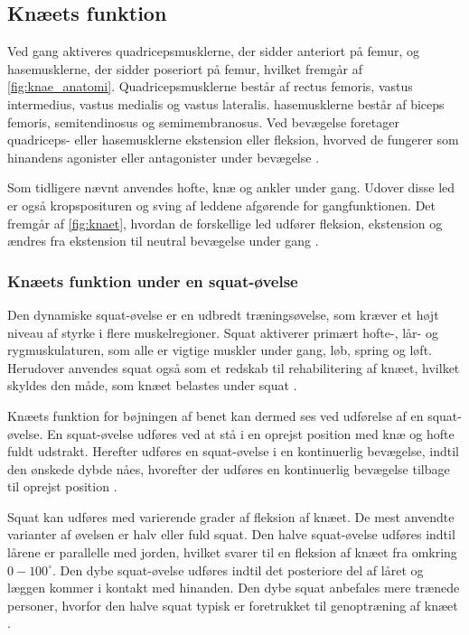 \subsection{Knæets funktion}
Ved gang aktiveres quadricepsmusklerne, der sidder anteriort på femur, og hasemusklerne, der sidder poseriort på femur, hvilket fremgår af \autoref{fig:knae_anatomi}. Quadricepsmusklerne består af rectus femoris, vastus intermedius, vastus medialis og vastus lateralis. hasemusklerne består af biceps femoris, semitendinosus og semimembranosus. Ved bevægelse foretager quadriceps- eller hasemusklerne ekstension eller fleksion, hvorved de fungerer som hinandens agonister eller antagonister under bevægelse \citep{martini2012}. 

Som tidligere nævnt anvendes hofte, knæ og ankler under gang. Udover disse led er også kropsposituren og sving af leddene afgørende for gangfunktionen. Det fremgår af \autoref{fig:knaet}, hvordan de forskellige led udfører fleksion, ekstension og ændres fra ekstension til neutral bevægelse under gang \citep{martini2012}.

\subsubsection{Knæets funktion under en squat-øvelse}
Den dynamiske squat-øvelse er en udbredt træningsøvelse, som kræver et højt niveau af styrke i flere muskelregioner. Squat aktiverer primært hofte-, lår- og rygmuskulaturen, som alle er vigtige muskler under gang, løb, spring og løft. Herudover anvendes squat også som et redskab til rehabilitering af knæet, hvilket skyldes den måde, som knæet belastes under squat \citep{escamilla2001}. 

Knæets funktion for bøjningen af benet kan dermed ses ved udførelse af en squat-øvelse. En squat-øvelse udføres ved at stå i en oprejst position med knæ og hofte fuldt udstrakt. Herefter udføres en squat-øvelse i en kontinuerlig bevægelse, indtil den ønskede dybde nåes, hvorefter der udføres en kontinuerlig bevægelse tilbage til oprejst position \citep{escamilla2001}.

Squat kan udføres med varierende grader af fleksion af knæet. De mest anvendte varianter af øvelsen er halv eller fuld squat. Den halve squat-øvelse udføres indtil lårene er parallelle med jorden, hvilket svarer til en fleksion af knæet fra omkring $0-100^{\circ}$. Den dybe squat-øvelse udføres indtil det posteriore del af låret og læggen kommer i kontakt med hinanden. Den dybe squat anbefales mere trænede personer, hvorfor den halve squat typisk er foretrukket til genoptræning af knæet \citep{escamilla2001}.

